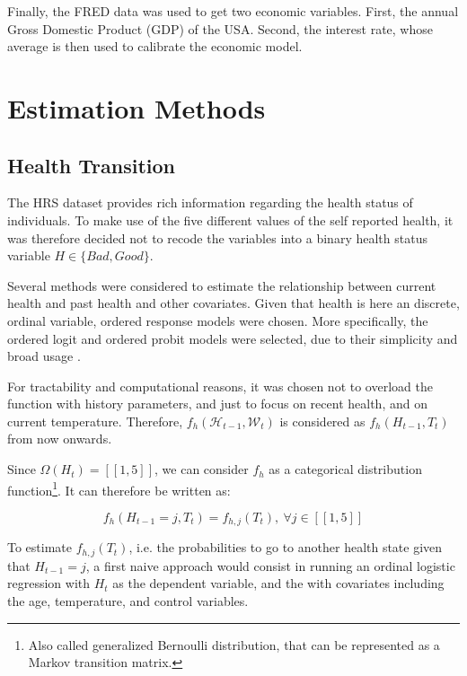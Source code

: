 \documentclass{article}
\begin{document}
Finally, the FRED data was used to get two economic variables. 
First, the annual Gross Domestic Product (GDP) of the USA. 
Second, the interest rate, whose average is then used to calibrate the economic model.

\section{Estimation Methods}

\subsection{Health Transition}

The HRS dataset provides rich information regarding the health status of individuals. 
To make use of the five different values of the self reported health, it was therefore decided not to
recode the variables into a binary health status variable $H\in\{Bad, Good\}$. 

Several methods were considered to estimate the relationship between current health and past health and other covariates. 
Given that health is here an discrete, ordinal variable, ordered response models were chosen.
More specifically, the ordered logit and ordered probit models were selected, due to their simplicity and broad usage \parencite{Wooldridge_2010}.

For tractability and computational reasons, 
it was chosen not to overload the function with 
history parameters, and just to focus on recent health, 
and on current temperature.
Therefore, 
$f_{h}(\mathcal{H}_{t-1},\mathcal{W}_{t})$ 
is considered as $f_{h}(H_{t-1},{T}_{t})$ from now onwards.

Since $\Omega(H_{t}) = [\![1,5]\!]$, we can consider 
$f_{h}$ as a categorical distribution
function\footnote{Also called generalized Bernoulli distribution, that can be represented as a Markov transition matrix.}.
It can therefore be written as: 

\begin{equation}
    f_{h}(H_{t-1} = j,{T}_{t}) = 
    f_{h,j}(T_{t}), \ \forall j\in [\![1,5]\!]
\end{equation}

To estimate $f_{h,j}(T_{t})$,
i.e. the probabilities to go to another health state
given that $H_{t-1} = j$, 
a first naive approach would consist 
in running an ordinal logistic 
regression with $H_{t}$ as the dependent 
variable, and the with covariates including 
the age, temperature, and control variables.
\end{document}
